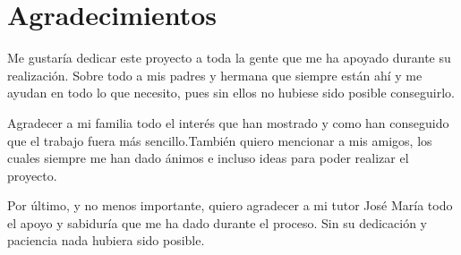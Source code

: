 \chapter*{Agradecimientos}

Me  gustaría  dedicar  este  proyecto  a  toda  la  gente  que  me  ha  apoyado  durante  su realización. Sobre todo  a mis padres  y hermana que siempre están ahí y me ayudan en todo lo que necesito, pues sin ellos no hubiese sido posible conseguirlo.

Agradecer a mi familia todo el interés que han mostrado y como han conseguido que el trabajo fuera más sencillo.También quiero mencionar a mis amigos, los cuales siempre me han dado ánimos e incluso ideas para poder realizar el proyecto.

Por  último,  y  no  menos  importante,  quiero  agradecer  a  mi  tutor  José María todo el apoyo y sabiduría que me ha dado durante el proceso. Sin su dedicación y paciencia nada hubiera sido posible.